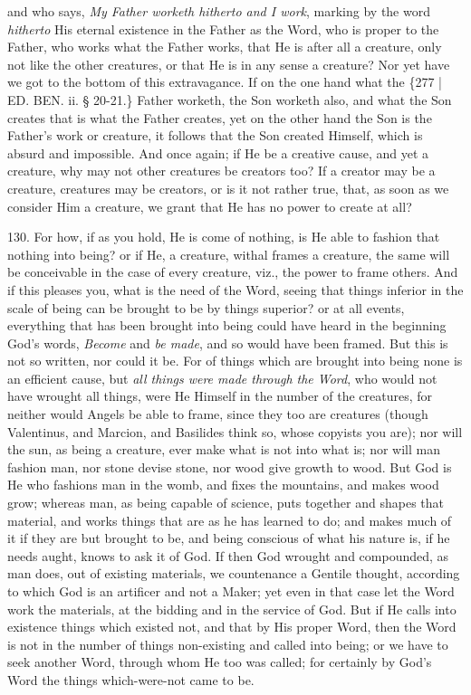 and who says, \emph{My Father worketh hitherto and I work}, marking by
the word \emph{hitherto} His eternal existence in the Father as the
Word, who is proper to the Father, who works what the Father works,
that He is after all a creature, only not like the other creatures, or
that He is in any sense a creature? Nor yet have we got to the bottom
of this extravagance. If on the one hand what the \{277 | ED.
BEN. ii. § 20-21.\} Father worketh, the Son
worketh also, and what the Son creates that is what the Father
creates, yet on the other hand the Son is the Father's work or
creature, it follows that the Son created Himself, which is absurd and
impossible. And once again; if He be a creative cause, and yet a
creature, why may not other creatures be creators too? If a creator
may be a creature, creatures may be creators, or is it not rather
true, that, as soon as we consider Him a creature, we grant that He
has no power to create at all?

130. For how, if as you hold,
He is come of nothing, is He able to fashion that nothing into being?
or if He, a creature, withal frames a creature, the same will be
conceivable in the case of every creature, viz., the power to frame
others. And if this pleases you, what is the need of the Word, seeing
that things inferior in the scale of being can be brought to be by
things superior? or at all events, everything that has been brought
into being could have heard in the beginning God's words, \emph{Become}
and \emph{be made}, and so would have been framed. But this is not so
written, nor could it be. For of things which are brought into being
none is an efficient cause, but \emph{all things were made through the
Word}, who would not have wrought all things, were He Himself in
the number of the creatures, for neither would Angels be able to
frame, since they too are creatures (though Valentinus, and Marcion,
and Basilides think so, whose copyists you are); nor will the sun, as
being a creature, ever make what is not into what is; nor will man
fashion man, nor stone devise stone, nor wood give growth to wood. But
God is He who fashions man in the womb, and fixes the mountains, and
makes wood grow; whereas man, as being capable of science, puts
together and shapes that material, and works things that are as he has
learned to do; and makes much of it if they are but brought to be, and
being conscious of what his nature is, if he needs aught, knows
to ask it of God. If then God wrought and compounded, as man does, out
of existing materials, we countenance a Gentile thought, according to
which God is an artificer and not a Maker; yet even in that case let
the Word work the materials, at the bidding and in the service of God.
But if He calls into existence things which existed not, and that by
His proper Word, then the Word is not in the number of things
non-existing and called into being; or we have to seek another Word,
through whom He too was called; for certainly by God's Word the things
which-were-not came to be.

